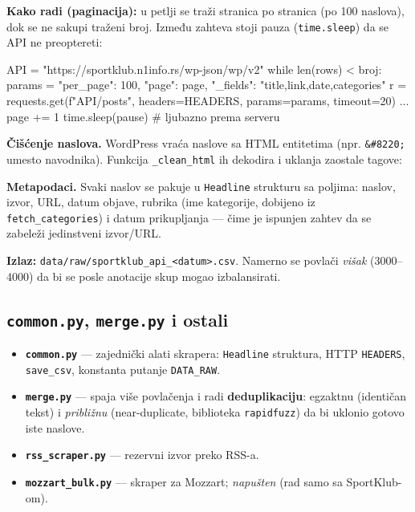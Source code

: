 \documentclass[11pt,a4paper]{article}
\newcommand{\fajl}[1]{\textbf{\texttt{#1}}}
\newcommand{\kod}[1]{\texttt{#1}}
\begin{document}
\textbf{Kako radi (paginacija):} u petlji se traži stranica po stranica (po 100
naslova), dok se ne sakupi traženi broj. Između zahteva stoji pauza (\kod{time.sleep})
da se API ne preoptereti:

\begin{code}
API = "https://sportklub.n1info.rs/wp-json/wp/v2"
while len(rows) < broj:
    params = {"per_page": 100, "page": page,
              "_fields": "title,link,date,categories"}
    r = requests.get(f"{API}/posts", headers=HEADERS, params=params, timeout=20)
    ...
    page += 1
    time.sleep(pause)        # ljubazno prema serveru
\end{code}

\textbf{Čišćenje naslova.} WordPress vraća naslove sa HTML entitetima (npr.
\kod{\&\#8220;} umesto navodnika). Funkcija \kod{\_clean\_html} ih dekodira i uklanja
zaostale tagove:


\textbf{Metapodaci.} Svaki naslov se pakuje u \kod{Headline} strukturu sa poljima:
naslov, izvor, URL, datum objave, rubrika (ime kategorije, dobijeno iz
\kod{fetch\_categories}) i datum prikupljanja --- čime je ispunjen zahtev da se
zabeleži jedinstveni izvor/URL.

\textbf{Izlaz:} \kod{data/raw/sportklub\_api\_<datum>.csv}. Namerno se povlači
\emph{višak} (3000--4000) da bi se posle anotacije skup mogao izbalansirati.

\subsection{\texttt{common.py}, \texttt{merge.py} i ostali}
\begin{itemize}[nosep]
  \item \fajl{common.py} --- zajednički alati skrapera: \kod{Headline} struktura,
    HTTP \kod{HEADERS}, \kod{save\_csv}, konstanta putanje \kod{DATA\_RAW}.
  \item \fajl{merge.py} --- spaja više povlačenja i radi \textbf{deduplikaciju}:
    egzaktnu (identičan tekst) i \emph{približnu} (near-duplicate, biblioteka
    \kod{rapidfuzz}) da bi uklonio gotovo iste naslove.
  \item \fajl{rss\_scraper.py} --- rezervni izvor preko RSS-a.
  \item \fajl{mozzart\_bulk.py} --- skraper za Mozzart; \emph{napušten} (rad samo sa
    SportKlub-om).
\end{itemize}
\end{document}
